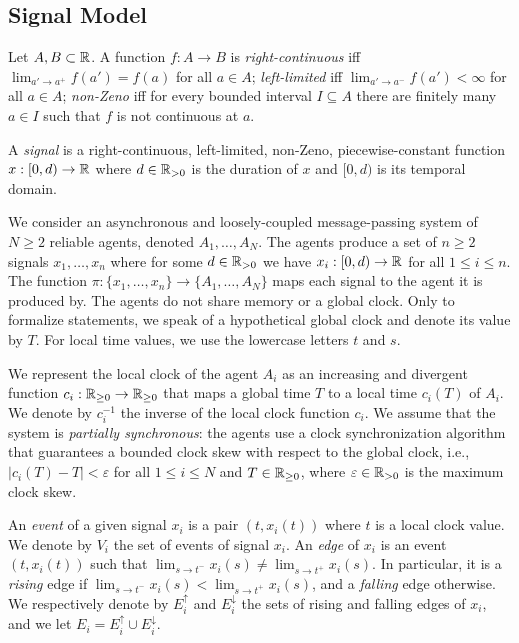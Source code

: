 \subsection{Signal Model}

Let $A,B \subset \mathbb{R}$.
A function $f : A \to B$ is
\emph{right-continuous} iff $\lim_{a' \to a^+} f(a') = f(a)$ for all $a \in A$;
\emph{left-limited} iff $\lim_{a' \to a^-} f(a') < \infty$ for all $a \in A$;
\emph{non-Zeno} iff for every bounded interval $I \subseteq A$ there are finitely many $a \in I$ such that $f$ is not continuous at $a$.

\begin{definition}
	A \emph{signal} is a right-continuous, left-limited, non-Zeno, piecewise-constant function $x : [0,d) \to \mathbb{R}$ where $d \in \mathbb{R}_{> 0}$ is the duration of $x$ and $[0,d)$ is its temporal domain.
\end{definition}

We consider an asynchronous and loosely-coupled message-passing system of $N \geq 2$ reliable agents, denoted $A_1, \ldots, A_N$.
The agents produce a set of $n \geq 2$ signals $x_1, \ldots, x_n$ where for some $d \in \mathbb{R}_{> 0}$ we have $x_i : [0,d) \to \mathbb{R}$ for all $1 \leq i \leq n$.
The function $\pi : \{x_1, \ldots, x_n\} \to \{A_1, \ldots, A_N\}$ maps each signal to the agent it is produced by.
The agents do not share memory or a global clock.
Only to formalize statements, we speak of a hypothetical global clock and denote its value by $T$.
For local time values, we use the lowercase letters $t$ and $s$.

We represent the local clock of the agent $A_i$ as an increasing and divergent function $c_i : \mathbb{R}_{\geq 0} \to \mathbb{R}_{\geq 0}$ that maps a global time $T$ to a local time $c_i(T)$ of $A_i$.
We denote by $c_i^{-1}$ the inverse of the local clock function $c_i$.
We assume that the system is \emph{partially synchronous}: the agents use a clock synchronization algorithm that guarantees a bounded clock skew with respect to the global clock, i.e., $|c_i(T) - T| < \varepsilon$ for all $1 \leq i \leq N$ and $T \in \mathbb{R}_{\geq 0}$, where $\varepsilon \in \mathbb{R}_{> 0}$ is the maximum clock skew.

An \emph{event} of a given signal $x_i$ is a pair $(t, x_i(t))$ where $t$ is a local clock value.
We denote by $V_i$ the set of events of signal $x_i$.
An \emph{edge} of $x_i$ is an event $(t, x_i(t))$ such that $\lim_{s \to t^-} x_i(s) \neq \lim_{s \to t^+} x_i(s)$.
In particular, it is a \emph{rising} edge if $\lim_{s \to t^-} x_i(s) < \lim_{s \to t^+} x_i(s)$, and a \emph{falling} edge otherwise.
We respectively denote by $E_i^\uparrow$ and $E_i^\downarrow$ the sets of rising and falling edges of $x_i$, and we let $E_i = E_i^\uparrow \cup E_i^\downarrow$.

